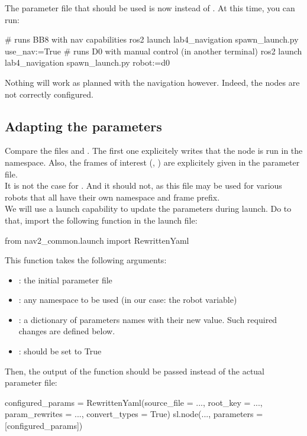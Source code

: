 \documentclass{ecnreport}
\begin{document}
The parameter file that should be used is now  instead of . At this time, you can run:
\begin{bashcodelarge}
# runs BB8 with nav capabilities
ros2 launch lab4_navigation spawn_launch.py use_nav:=True
# runs D0 with manual control (in another terminal)
ros2 launch lab4_navigation spawn_launch.py robot:=d0
 \end{bashcodelarge}
 Nothing will work as planned with the navigation however. Indeed, the nodes are not correctly configured.

\subsection{Adapting the parameters}

Compare the files  and . The first one explicitely writes that the node is run in the  namespace. Also, the frames of interest (, ) are explicitely given in the parameter file.\\

It is not the case for . And it should not, as this file may be used for various robots that all have their own namespace and frame prefix.\\
We will use a launch capability to update the parameters during launch. Do to that, import the following function in the launch file:
\begin{pythoncodelarge}
from nav2_common.launch import RewrittenYaml
\end{pythoncodelarge}

This function takes the following arguments:
\begin{itemize}
\item {}: the initial parameter file
\item {}: any namespace to be used (in our case: the robot variable)
\item {}: a dictionary of parameters names with their new value. Such required changes are defined below.
\item {}: should be set to True
\end{itemize}

Then, the output of the function should be passed instead of the actual parameter file:
\begin{pythoncodelarge}
configured_params = RewrittenYaml(source_file = ...,
                                    root_key = ..., 
                                    param_rewrites = ...,
                                    convert_types = True)
sl.node(..., parameters = [configured_params])
\end{pythoncodelarge}
\end{document}
